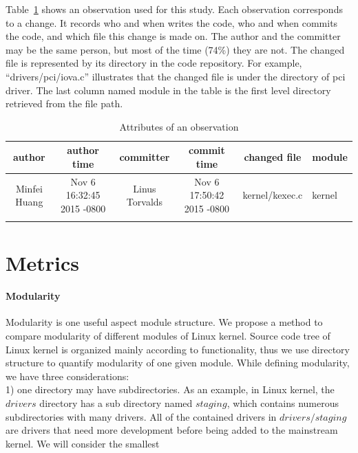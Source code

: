 \documentclass{sig-alternate-05-2015}
\begin{document}
Table~\ref{tab:data} shows an observation used for this study.
Each observation corresponds to a change. It records who and when writes the code,
who and when commits the code, and which file this change is made on.
The author and the committer may be the same person, but most of the time (74\%) they are not.
The changed file is represented by its directory in the code repository.
For example, ``drivers/pci/iova.c'' illustrates that the changed file
is under the directory of pci driver. The last column named module in the table is
the first level directory retrieved from the file path.

\begin{table}
\centering
\caption{Attributes of an observation}
\begin{tabular}{c|c|c|c|c|l} \hline
author & author time & committer & commit time & changed file & module\\ \hline
 Minfei Huang & Nov 6 16:32:45 2015 -0800 & Linus Torvalds & Nov 6 17:50:42 2015 -0800 & kernel/kexec.c &kernel\\ \hline
\label{tab:data}
\end{tabular}
\end{table}


\section{Metrics}
\paragraph{Modularity}
Modularity is one useful aspect module structure. We propose a method to compare modularity of different modules of Linux kernel. Source code tree of Linux kernel is organized mainly according to functionality, thus we use directory structure to quantify modularity of one given module. While defining modularity, we have three considerations: \\
1) one directory may have subdirectories. As an example, in Linux kernel, the $drivers$ directory has a sub directory named $staging$, which contains numerous subdirectories with many drivers. All of the contained drivers in $drivers/staging$ are drivers that need more development before being added to the mainstream kernel. We will consider the smallest \\
\end{document}
